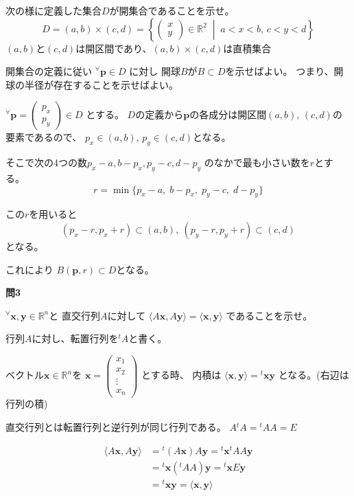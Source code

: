 \documentclass[12pt,b5paper]{ltjsarticle}
\begin{document}
次の様に定義した集合$D$が開集合であることを示せ。
\begin{equation}
 D = (a,b) \times (c,d)
            = \left\{ \begin{pmatrix}x\\y\end{pmatrix} \in \mathbb{R}^2 \;
               \middle| \; a<x<b, \, c<y<d \right\}
\end{equation}
$(a,b)$と$(c,d)$は開区間であり、$(a,b) \times (c,d)$は直積集合

\dotfill

開集合の定義に従い
${}^\forall \bm{p}\in D$ に対し 開球$B$が$B\subset D$を示せばよい。
つまり、開球の半径が存在することを示せばよい。


${}^\forall \bm{p}=\begin{pmatrix}p_x\\p_y\end{pmatrix}\in D$ とする。
$D$の定義から$\bm{p}$の各成分は開区間$(a,b),\, (c,d)$の要素であるので、
$p_x \in (a,b),\, p_y\in (c,d)$となる。

そこで次の4つの数$p_x-a, b-p_x, p_y-c, d-p_y$ のなかで最も小さい数を$r$とする。
\begin{equation}
 r = \min \{ p_x-a,\; b-p_x, \; p_y-c, \; d-p_y \}
\end{equation}

この$r$を用いると
\begin{equation}
 (p_x-r,p_x+r) \subset (a,b), \
 (p_y-r,p_y+r) \subset (c,d)
\end{equation}
となる。

これにより
$B(\bm{p},r)\subset D$となる。



\hrulefill

\textbf{問3}

${}^\forall \bm{x}, \bm{y} \in \mathbb{R}^n$と
直交行列$A$に対して
$\langle A\bm{x}, A\bm{y} \rangle = \langle \bm{x}, \bm{y} \rangle$
であることを示せ。

\dotfill

行列$A$に対し、転置行列を${}^t\!A$と書く。

ベクトル$\bm{x}\in\mathbb{R}^n$を
$\bm{x}=\begin{pmatrix}x_1\\x_2\\ \vdots \\ x_n\end{pmatrix}$
とする時、
内積は
$\langle \bm{x}, \bm{y} \rangle = {}^t\!\bm{x}\bm{y}$
となる。(右辺は行列の積)

直交行列とは転置行列と逆行列が同じ行列である。
$A{}^t\!A = {}^t\!AA = E$

\dotfill

\begin{align}
\langle A\bm{x}, A\bm{y} \rangle
 &= {}^t\!(A\bm{x})A\bm{y}
 = {}^t\!\bm{x}{}^t\!AA\bm{y}\\
 &= {}^t\!\bm{x}({}^t\!AA)\bm{y}
 = {}^t\!\bm{x}E\bm{y}\\
 &= {}^t\!\bm{x}\bm{y}
 = \langle \bm{x}, \bm{y} \rangle
\end{align}
\end{document}
